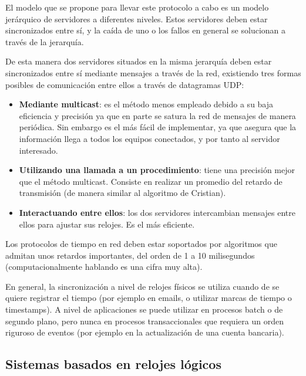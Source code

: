 \documentclass[a4paper, 11pt, titlepage]{article}
\begin{document}
            El modelo que se propone para llevar este protocolo a cabo es un modelo jerárquico de 
            servidores a diferentes niveles. Estos servidores deben estar sincronizados entre sí, y 
            la caída de uno o los fallos en general se solucionan a través de la jerarquía.

            De esta manera dos servidores situados en la misma jerarquía deben estar sincronizados entre 
            sí mediante mensajes a través de la red, existiendo tres formas posibles de comunicación 
            entre ellos a través de datagramas UDP:

            \begin{itemize}
                \item \textbf{Mediante multicast}: es el método menos empleado debido a su baja eficiencia 
                y precisión ya que en parte se satura la red de mensajes de manera periódica. Sin embargo 
                es el más fácil de implementar, ya que asegura que la información llega a todos los 
                equipos conectados, y por tanto al servidor interesado.
                \item \textbf{Utilizando una llamada a un procedimiento}: tiene una precisión mejor que 
                el método multicast. Consiste en realizar un promedio del retardo de transmisión (de 
                manera similar al algoritmo de Cristian).
                \item \textbf{Interactuando entre ellos}: los dos servidores intercambian mensajes entre 
                ellos para ajustar sus relojes. Es el más eficiente.
            \end{itemize}

            Los protocolos de tiempo en red deben estar soportados por algoritmos que admitan unos 
            retardos importantes, del orden de 1 a 10 milisegundos (computacionalmente hablando es una 
            cifra muy alta). 
            
            En general, la sincronización a nivel de relojes físicos se utiliza cuando de se quiere 
            registrar el tiempo (por ejemplo en emails, o utilizar marcas de tiempo o timestamps). A 
            nivel de aplicaciones se puede utilizar en procesos batch o de segundo plano, pero nunca en 
            procesos transaccionales que requiera un orden riguroso de eventos (por ejemplo en la 
            actualización de una cuenta bancaria).

    \subsection{Sistemas basados en relojes lógicos}
\end{document}
